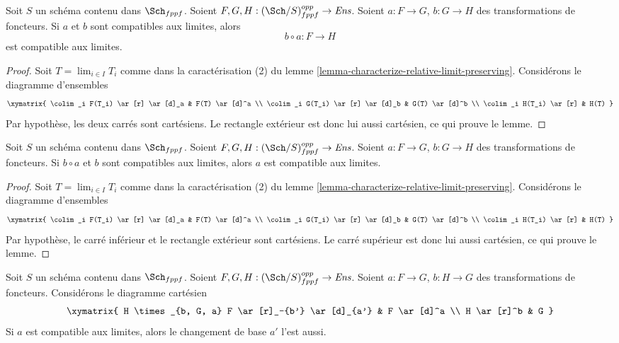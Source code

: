 \begin{lemma}
\label{lemma-composition-locally-finite-presentation}
Soit $S$ un schéma contenu dans $\Sch_{fppf}$.
Soient $F, G, H : (\Sch/S)_{fppf}^{opp} \to \textit{Ens}$.
Soient $a : F \to G$, $b : G \to H$ des transformations de foncteurs.
Si $a$ et $b$ sont compatibles aux limites, alors
$$
b \circ a : F \longrightarrow H
$$
est compatible aux limites.
\end{lemma}

\begin{proof}
Soit $T = \lim_{i \in I} T_i$ comme dans la caractérisation (2) du
lemme \ref{lemma-characterize-relative-limit-preserving}.
Considérons le diagramme d'ensembles
$$
\xymatrix{
\colim_i F(T_i) \ar[r] \ar[d]_a & F(T) \ar[d]^a \\
\colim_i G(T_i) \ar[r] \ar[d]_b & G(T) \ar[d]^b \\
\colim_i H(T_i) \ar[r] & H(T)
}
$$
Par hypothèse, les deux carrés sont cartésiens. Le
rectangle extérieur est donc lui aussi cartésien, ce qui prouve le lemme.
\end{proof}

\begin{lemma}
\label{lemma-locally-finite-presentation-permanence}
Soit $S$ un schéma contenu dans $\Sch_{fppf}$.
Soient $F, G, H : (\Sch/S)_{fppf}^{opp} \to \textit{Ens}$.
Soient $a : F \to G$, $b : G \to H$ des transformations de foncteurs.
Si $b \circ a$ et $b$ sont compatibles aux limites, alors $a$
est compatible aux limites.
\end{lemma}

\begin{proof}
Soit $T = \lim_{i \in I} T_i$ comme dans la caractérisation (2) du
lemme \ref{lemma-characterize-relative-limit-preserving}.
Considérons le diagramme d'ensembles
$$
\xymatrix{
\colim_i F(T_i) \ar[r] \ar[d]_a & F(T) \ar[d]^a \\
\colim_i G(T_i) \ar[r] \ar[d]_b & G(T) \ar[d]^b \\
\colim_i H(T_i) \ar[r] & H(T)
}
$$
Par hypothèse, le carré inférieur et le rectangle extérieur
sont cartésiens. Le carré supérieur
est donc lui aussi cartésien, ce qui prouve le lemme.
\end{proof}

\begin{lemma}
\label{lemma-base-change-locally-finite-presentation}
Soit $S$ un schéma contenu dans $\Sch_{fppf}$.
Soient $F, G, H : (\Sch/S)_{fppf}^{opp} \to \textit{Ens}$.
Soient $a : F \to G$, $b : H \to G$ des transformations de foncteurs.
Considérons le diagramme cartésien
$$
\xymatrix{
H \times_{b, G, a} F \ar[r]_-{b'} \ar[d]_{a'} & F \ar[d]^a \\
H \ar[r]^b & G
}
$$
Si $a$ est compatible aux limites, alors le changement de base $a'$ l'est aussi.
\end{lemma}

